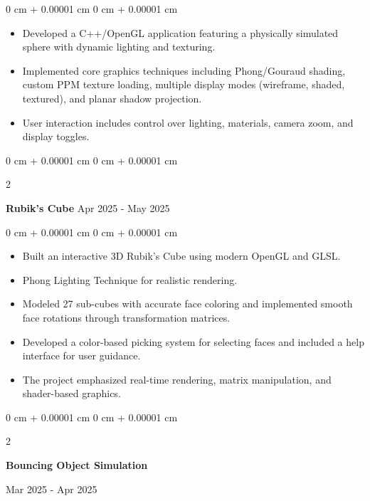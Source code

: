 \documentclass[10pt, letterpaper]{article}
\newenvironment{highlights}{
    \begin{itemize}[
        topsep=0.10 cm,
        parsep=0.10 cm,
        partopsep=0pt,
        itemsep=0pt,
        leftmargin=0 cm + 10pt
    ]
}{
    \end{itemize}
} %
\newenvironment{onecolentry}{
    \begin{adjustwidth}{
        0 cm + 0.00001 cm
    }{
        0 cm + 0.00001 cm
    }
}{
    \end{adjustwidth}
} %
\newenvironment{twocolentry}[2][]{
    \onecolentry
    \def\secondColumn{#2}
    \setcolumnwidth{\fill, 4.5 cm}
    \begin{paracol}{2}
}{
    \switchcolumn \raggedleft \secondColumn
    \end{paracol}
    \endonecolentry
} %
\begin{document}
        \vspace{0.10 cm}
        \begin{onecolentry}
            \begin{highlights}
                \item Developed a C++/OpenGL application featuring a physically simulated sphere with dynamic lighting and texturing. 

                \item Implemented core graphics techniques including Phong/Gouraud shading, custom PPM texture loading, multiple display modes (wireframe, shaded, textured), and planar shadow projection. 
                \item User interaction includes control over lighting, materials, camera zoom, and display toggles.
            \end{highlights}
        \end{onecolentry}

        \vspace{0.2 cm}

        \begin{twocolentry}{
            Apr 2025 - May 2025
        }
            \textbf{Rubik's Cube}\end{twocolentry}

        \vspace{0.10 cm}
        \begin{onecolentry}
            \begin{highlights}
                \item Built an interactive 3D Rubik’s Cube using modern OpenGL and GLSL. 
                \item Phong Lighting Technique for realistic rendering. 
                \item Modeled 27 sub-cubes with accurate face coloring and implemented smooth face rotations through transformation matrices.
                \item Developed a color-based picking system for selecting faces and included a help interface for user guidance. 
                \item The project emphasized real-time rendering, matrix manipulation, and shader-based graphics.
            \end{highlights}
        \end{onecolentry}

        
        \vspace{0.2 cm}

        \begin{twocolentry}{
            Mar 2025 - Apr 2025
        }
            \textbf{Bouncing Object Simulation}
            \end{twocolentry}
\end{document}

